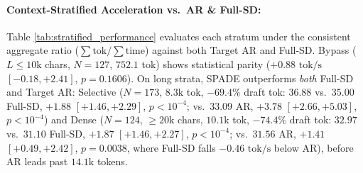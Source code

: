 \documentclass[11pt]{article}
\begin{document}


\paragraph{Context-Stratified Acceleration vs.\ AR \& Full-SD:}
Table \ref{tab:stratified_performance} evaluates each stratum under the consistent aggregate ratio ($\sum\text{tok}/\sum\text{time}$) against both Target AR and Full-SD. Bypass ($L \le 10\text{k}$ chars, $N=127$, $752.1$ tok) shows statistical parity ($+0.88\text{ tok/s}$ $[-0.18, +2.41]$, $p=0.1606$). On long strata, SPADE outperforms \textit{both} Full-SD and Target AR: Selective ($N=173$, $8.3\text{k}$ tok, $-69.4\%$ draft tok: $36.88$ vs.\ $35.00$ Full-SD, $+1.88$ $[+1.46, +2.29]$, $p<10^{-4}$; vs.\ $33.09$ AR, $+3.78$ $[+2.66, +5.03]$, $p<10^{-4}$) and Dense ($N=124$, $\ge 20\text{k}$ chars, $10.1\text{k}$ tok, $-74.4\%$ draft tok: $32.97$ vs.\ $31.10$ Full-SD, $+1.87$ $[+1.46, +2.27]$, $p<10^{-4}$; vs.\ $31.56$ AR, $+1.41$ $[+0.49, +2.42]$, $p=0.0038$, where Full-SD falls $-0.46\text{ tok/s}$ below AR), before AR leads past $14.1\text{k}$ tokens.


\end{document}
